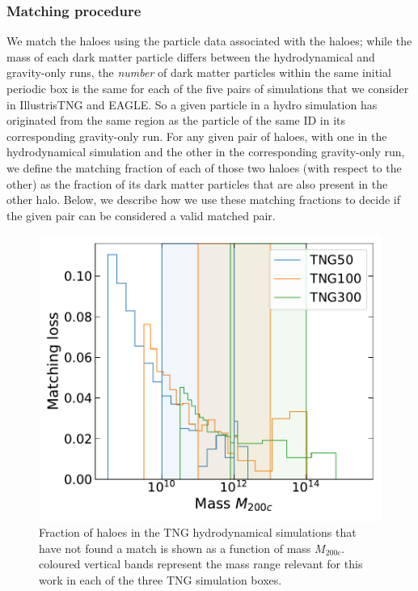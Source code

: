 \subsubsection{Matching procedure}
We match the haloes using the particle data associated with the haloes;
while the mass of each dark matter particle differs between the hydrodynamical and gravity-only runs, the \emph{number} of dark matter particles within the same initial periodic box is the same for each of the five pairs of simulations that we consider in IllustrisTNG and EAGLE. So a given particle in a hydro simulation has originated from the same region as the particle of the same ID in its corresponding gravity-only run.
For any given pair of haloes, with one in the hydrodynamical simulation and the other in the corresponding gravity-only run, we define the matching fraction of each of those two haloes (with respect to the other) 
as the fraction of its dark matter particles that are also present in the other halo. Below, we describe how we use 
these matching fractions to decide if the given pair can be considered a valid matched pair. 


\begin{figure}
    \centering
    \includegraphics[width=\linewidth]{plots/hal_match_efficiency_mass_all.pdf}
    \caption{Fraction of haloes in the TNG hydrodynamical simulations that have not found a match is shown as a function of mass $M_{200c}$. coloured vertical bands represent the mass range relevant for this work in each of the three TNG simulation boxes.}
    \label{fig:matching-loss-all-ch:simbase}
\end{figure}

